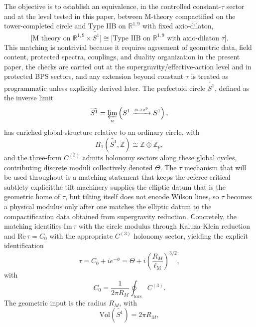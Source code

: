 \documentclass[11pt]{article}
\theoremstyle{remark}
\newcommand{\Z}{\mathbb{Z}}
\newcommand{\R}{\mathbb{R}}
\newcommand{\tS}{\widetilde{S^{1}}}
\newcommand{\Mpl}{\ensuremath{\ell_{\mathrm{M}}}}
\begin{document}
The objective is to establish an equivalence, in the controlled constant-\(\tau\) sector and at the level tested in this paper, between M-theory compactified on the tower-completed circle and Type IIB on \(\R^{1,9}\) with fixed axio-dilaton,
\begin{equation}
\label{eq:physical-duality}
\bigl[\text{M theory on } \R^{1,9} \times \tS \bigr] 
\cong 
\bigl[\text{Type IIB on } \R^{1,9} \text{ with axio-dilaton } \tau \bigr].
\end{equation}
This matching is nontrivial because it requires agreement of geometric data, field content, protected spectra, couplings, and duality organization\; in the present paper, the checks are carried out at the supergravity/effective-action level and in protected BPS sectors, and any extension beyond constant \(\tau\) is treated as programmatic unless explicitly derived later. The perfectoid circle \(\tS\), defined as the inverse limit
\begin{equation}
\tS = \varprojlim_{n} \left( S^{1} \xrightarrow{z \mapsto z^{p}} S^{1} \right),
\end{equation}
has enriched global structure relative to an ordinary circle, with
\begin{equation}
H_{1}(\tS, \Z) \cong \Z \oplus \Z_{p},
\end{equation}
and the three-form \(C^{(3)}\) admits holonomy sectors along these global cycles, contributing discrete moduli collectively denoted \(\Theta\). The \(\tau\) mechanism that will be used throughout is a matching statement that keeps the referee-critical subtlety explicit\:the tilt machinery supplies the elliptic datum that is the geometric home of \(\tau\), but tilting itself does not encode Wilson lines, so \(\tau\) becomes a physical modulus only after one matches the elliptic datum to the compactification data obtained from supergravity reduction. Concretely, the matching identifies \(\mathrm{Im}\,\tau\) with the circle modulus through Kaluza-Klein reduction and \(\mathrm{Re}\,\tau=C_{0}\) with the appropriate \(C^{(3)}\) holonomy sector, yielding the explicit identification
\begin{equation}
\label{eq:tau-identification}
\tau = C_{0} + i e^{-\phi} = \Theta + i \left( \frac{R_{M}}{\Mpl} \right)^{\!3/2},
\end{equation}
with
\begin{equation}
C_{0} = \frac{1}{2\pi R_{M}} \oint_{\text{tors}} C^{(3)}.
\end{equation}
The geometric input is the radius \(R_M\), with
\begin{equation}
\mathrm{Vol}(\tS) = 2 \pi R_{M},
\end{equation}
\end{document}
